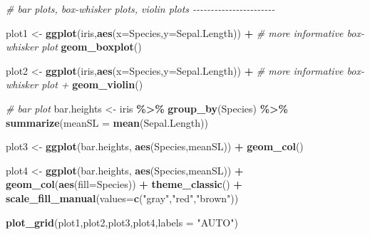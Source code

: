 \documentclass[
]{article}
\newenvironment{Shaded}{\begin{snugshade}}{\end{snugshade}}
\newcommand{\AttributeTok}[1]{\textcolor[rgb]{0.13,0.29,0.53}{#1}}
\newcommand{\CommentTok}[1]{\textcolor[rgb]{0.56,0.35,0.01}{\textit{#1}}}
\newcommand{\FunctionTok}[1]{\textcolor[rgb]{0.13,0.29,0.53}{\textbf{#1}}}
\newcommand{\NormalTok}[1]{#1}
\newcommand{\OtherTok}[1]{\textcolor[rgb]{0.56,0.35,0.01}{#1}}
\newcommand{\SpecialCharTok}[1]{\textcolor[rgb]{0.81,0.36,0.00}{\textbf{#1}}}
\newcommand{\StringTok}[1]{\textcolor[rgb]{0.31,0.60,0.02}{#1}}
\begin{document}
\begin{Shaded}
\begin{Highlighting}[]
\CommentTok{\# bar plots, box{-}whisker plots, violin plots  {-}{-}{-}{-}{-}{-}{-}{-}{-}{-}{-}{-}{-}{-}{-}{-}{-}{-}{-}{-}{-}{-}{-}}

\NormalTok{plot1 }\OtherTok{\textless{}{-}} \FunctionTok{ggplot}\NormalTok{(iris,}\FunctionTok{aes}\NormalTok{(}\AttributeTok{x=}\NormalTok{Species,}\AttributeTok{y=}\NormalTok{Sepal.Length)) }\SpecialCharTok{+}    \CommentTok{\# more informative box{-}whisker plot}
  \FunctionTok{geom\_boxplot}\NormalTok{() }
  
\NormalTok{plot2 }\OtherTok{\textless{}{-}} \FunctionTok{ggplot}\NormalTok{(iris,}\FunctionTok{aes}\NormalTok{(}\AttributeTok{x=}\NormalTok{Species,}\AttributeTok{y=}\NormalTok{Sepal.Length)) }\SpecialCharTok{+}    \CommentTok{\# more informative box{-}whisker plot +}
  \FunctionTok{geom\_violin}\NormalTok{() }

\CommentTok{\# bar plot}
\NormalTok{bar.heights }\OtherTok{\textless{}{-}}\NormalTok{ iris }\SpecialCharTok{\%\textgreater{}\%} 
  \FunctionTok{group\_by}\NormalTok{(Species) }\SpecialCharTok{\%\textgreater{}\%} 
  \FunctionTok{summarize}\NormalTok{(}\AttributeTok{meanSL =} \FunctionTok{mean}\NormalTok{(Sepal.Length))}

\NormalTok{plot3 }\OtherTok{\textless{}{-}} \FunctionTok{ggplot}\NormalTok{(bar.heights, }\FunctionTok{aes}\NormalTok{(Species,meanSL)) }\SpecialCharTok{+}
  \FunctionTok{geom\_col}\NormalTok{()}


\NormalTok{plot4 }\OtherTok{\textless{}{-}} \FunctionTok{ggplot}\NormalTok{(bar.heights, }\FunctionTok{aes}\NormalTok{(Species,meanSL)) }\SpecialCharTok{+}
  \FunctionTok{geom\_col}\NormalTok{(}\FunctionTok{aes}\NormalTok{(}\AttributeTok{fill=}\NormalTok{Species)) }\SpecialCharTok{+}
  \FunctionTok{theme\_classic}\NormalTok{() }\SpecialCharTok{+}
  \FunctionTok{scale\_fill\_manual}\NormalTok{(}\AttributeTok{values=}\FunctionTok{c}\NormalTok{(}\StringTok{"gray"}\NormalTok{,}\StringTok{"red"}\NormalTok{,}\StringTok{"brown"}\NormalTok{))}
  
\FunctionTok{plot\_grid}\NormalTok{(plot1,plot2,plot3,plot4,}\AttributeTok{labels =} \StringTok{"AUTO"}\NormalTok{)}
\end{Highlighting}
\end{Shaded}
\end{document}
